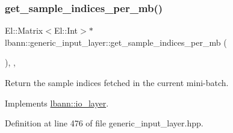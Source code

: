 \subsubsection{\texorpdfstring{get\+\_\+sample\+\_\+indices\+\_\+per\+\_\+mb()}{get\_sample\_indices\_per\_mb()}}
{\footnotesize\ttfamily El\+::\+Matrix$<$El\+::\+Int$>$$\ast$ lbann\+::generic\+\_\+input\+\_\+layer\+::get\+\_\+sample\+\_\+indices\+\_\+per\+\_\+mb (\begin{DoxyParamCaption}{ }\end{DoxyParamCaption})\hspace{0.3cm}{\ttfamily [inline]}, {\ttfamily [override]}, {\ttfamily [virtual]}}

Return the sample indices fetched in the current mini-\/batch. 

Implements \hyperlink{classlbann_1_1io__layer_ab319ad5697e002072ee03e8c64523fb5}{lbann\+::io\+\_\+layer}.



Definition at line 476 of file generic\+\_\+input\+\_\+layer.\+hpp.


